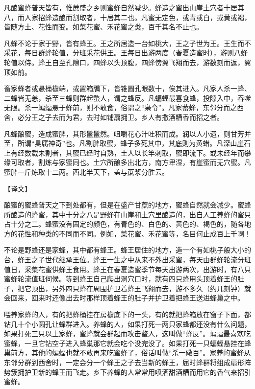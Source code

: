 \documentclass[12pt,UTF8]{ctexbook}
\begin{document}
凡酿蜜蜂普天皆有，惟蔗盛之乡则蜜蜂自然减少。蜂造之蜜出山崖土穴者十居其八，而人家招蜂造酿而割取者，十居其二也。凡蜜无定色，或青或白，或黄或褐，皆随方土、花性而变。如菜花蜜、禾花蜜之类，百千其名不止也。

凡蜂不论于家于野，皆有蜂王。王之所居造一台如桃大，王之子世为王。王生而不采花，每日群蜂轮值，分班采花供王。王每日出游两度（春夏造蜜时），游则八蜂轮值以侍。蜂王自至孔隙口，四蜂以头顶腹，四蜂傍翼飞翔而去，游数刻而返，翼顶如前。

畜家蜂者或悬桶檐端，或置箱牖下，皆锥圆孔眼数十，俟其进入。凡家人杀一蜂、二蜂皆无恙，杀至三蜂则群起螫人，谓之蜂反。凡蝙蝠最喜食蜂，投隙入中，吞噬无限。杀一蝙蝠悬于蜂前，则不敢食，俗谓之“枭令”。凡家蓄蜂，东邻分而之西舍，必分王之子去而为君，去时如铺扇拥卫。乡人有撒酒糟香而招之者。

凡蜂酿蜜，造成蜜脾，其形鬣鬣然。咀嚼花心汁吐积而成。润以人小遗，则甘芳并至，所谓“臭腐神奇”也。凡割脾取蜜，蜂子多死其中，其底则为黄蜡。凡深山崖石上有经数载未割者，其蜜已经时自熟，土人以长竿刺取，蜜即流下。或未经年而攀缘可取者，割炼与家蜜同也。土穴所酿多出北方，南方卑湿，有崖蜜而无穴蜜。凡蜜脾一斤炼取十二两。西北半天下，盖与蔗浆分胜云。

【译文】

酿蜜的蜜蜂普天之下到处都有，但是在盛产甘蔗的地方，蜜蜂自然就会减少。蜜蜂所酿造的蜂蜜，其中十分之八是野蜂在山崖和土穴里酿造的，出自人工养蜂的蜜只占十分之二。蜂蜜没有固定的颜色，有青色的、白色的、黄色的、褐色的，随各地方的花性和种类的不同而不同。例如，菜花蜜、禾花蜜等，名目何止成百上千啊！

不论是野蜂还是家蜂，其中都有蜂王。蜂王居住的地方，造一个有如桃子般大小的台，蜂王之子世代继承王位。蜂王一生之中从来不外出采蜜，每天由群蜂轮流分班值日，采集花蜜供蜂王食用。蜂王在春夏造蜜季节每天出游两次，出游时，有八只蜜蜂轮流值班伺候。等到蜂王自己爬出洞穴口时，就有四只蜂用头顶着蜂王的肚子，把它顶出，另外四只蜂在周围护卫着蜂王飞翔而去，游不多久（约几刻钟）就会回来，回来时还像出去时那样顶着蜂王的肚子并护卫着把蜂王送进蜂巢之中。

喂养家蜂的人，有的把蜂桶挂在房檐底下的一头，有的就把蜂箱放在窗子下面，都钻几十个小圆孔让蜂群进入。养蜂的人，如果打死一两只家蜂都还没有什么问题，如果打死三只以上家蜂，蜜蜂就会群起而攻击螫人，这叫做“蜂反”。蝙蝠最喜欢吃蜜蜂，一旦它钻空子进入蜂巢那它就会吃个没完没了。如果打死一只蝙蝠悬挂在蜂巢前方，其他的蝙蝠也就不敢再来吃蜜蜂了，俗话叫做“杀一儆百”。家养的蜜蜂从东邻分群到西舍时，一定会分一个蜂王之子去当新的蜂王，届时蜂群将组成扇形阵势簇拥护卫新的蜂王而飞走。乡下养蜂的人常常用喷洒甜酒糟而用它的香气来招引蜜蜂。
\end{document}
